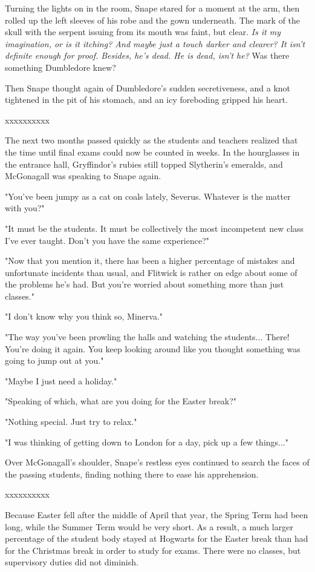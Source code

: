 \documentclass[a4paper,11pt]{article}
\begin{document}
Turning the lights on in the room, Snape stared for a moment at the arm, then rolled up the left sleeves of his robe and the gown underneath. The mark of the skull with the serpent issuing from its mouth was faint, but clear. \emph{Is it my imagination, or is it itching? And maybe just a touch darker and clearer? It isn't definite enough for proof. Besides, he's dead. He is dead, isn't he?} Was there something Dumbledore knew?

Then Snape thought again of Dumbledore's sudden secretiveness, and a knot tightened in the pit of his stomach, and an icy foreboding gripped his heart.

xxxxxxxxxx

The next two months passed quickly as the students and teachers realized that the time until final exams could now be counted in weeks. In the hourglasses in the entrance hall, Gryffindor's rubies still topped Slytherin's emeralds, and McGonagall was speaking to Snape again.

"You've been jumpy as a cat on coals lately, Severus. Whatever is the matter with you?"

"It must be the students. It must be collectively the most incompetent new class I've ever taught. Don't you have the same experience?"

"Now that you mention it, there has been a higher percentage of mistakes and unfortunate incidents than usual, and Flitwick is rather on edge about some of the problems he's had. But you're worried about something more than just classes."

"I don't know why you think so, Minerva."

"The way you've been prowling the halls and watching the students... There! You're doing it again. You keep looking around like you thought something was going to jump out at you."

"Maybe I just need a holiday."

"Speaking of which, what are you doing for the Easter break?"

"Nothing special. Just try to relax."

"I was thinking of getting down to London for a day, pick up a few things..."

Over McGonagall's shoulder, Snape's restless eyes continued to search the faces of the passing students, finding nothing there to ease his apprehension.

xxxxxxxxxx

Because Easter fell after the middle of April that year, the Spring Term had been long, while the Summer Term would be very short. As a result, a much larger percentage of the student body stayed at Hogwarts for the Easter break than had for the Christmas break in order to study for exams. There were no classes, but supervisory duties did not diminish.
\end{document}
